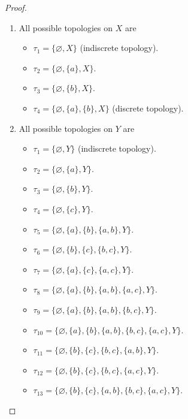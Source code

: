 \begin{proof}
    \begin{enumerate}[label={(\alph*)}]
        \item All possible topologies on $X$ are
              \begin{itemize}
                  \item $\tau_{1} = \{ \varnothing, X \}$ (indiscrete topology).
                  \item $\tau_{2} = \{ \varnothing, \{ a \}, X \}$.
                  \item $\tau_{3} = \{ \varnothing, \{ b \}, X \}$.
                  \item $\tau_{4} = \{ \varnothing, \{ a \}, \{ b \}, X \}$ (discrete topology).
              \end{itemize}
        \item All possible topologies on $Y$ are
              \begin{itemize}
                  \item $\tau_{1} = \{ \varnothing, Y \}$ (indiscrete topology).
                  \item $\tau_{2} = \{ \varnothing, \{ a \}, Y \}$.
                  \item $\tau_{3} = \{ \varnothing, \{ b \}, Y \}$.
                  \item $\tau_{4} = \{ \varnothing, \{ c \}, Y \}$.
                  \item $\tau_{5} = \{ \varnothing, \{ a \}, \{ b \}, \{ a, b \}, Y \}$.
                  \item $\tau_{6} = \{ \varnothing, \{ b \}, \{ c \}, \{ b, c \}, Y \}$.
                  \item $\tau_{7} = \{ \varnothing, \{ a \}, \{ c \}, \{ a, c \}, Y \}$.
                  \item $\tau_{8} = \{ \varnothing, \{ a \}, \{ b \}, \{ a, b \}, \{ a, c \}, Y \}$.
                  \item $\tau_{9} = \{ \varnothing, \{ a \}, \{ b \}, \{ a, b \}, \{ b, c \}, Y \}$.
                  \item $\tau_{10} = \{ \varnothing, \{ a \}, \{ b \}, \{ a, b \}, \{ b, c \}, \{ a, c \}, Y \}$.
                  \item $\tau_{11} = \{ \varnothing, \{ b \}, \{ c \}, \{ b, c \}, \{ a, b \}, Y \}$.
                  \item $\tau_{12} = \{ \varnothing, \{ b \}, \{ c \}, \{ b, c \}, \{ a, c \}, Y \}$.
                  \item $\tau_{13} = \{ \varnothing, \{ b \}, \{ c \}, \{ a, b \}, \{ b, c \}, \{ a, c \}, Y \}$.

\end{itemize}
\end{enumerate}
\end{proof}
